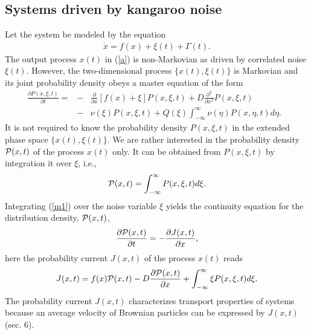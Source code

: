 \documentclass[authoryear,draft,1p,times]{elsarticle}
\renewcommand{\=}{\stackrel{\mathrm{d}}{=}}
\begin{document}

\subsection{Systems driven by kangaroo noise }

Let the system be  modeled by the equation  
%
\begin{eqnarray} \label{a}
\dot x = f(x)  + \xi(t) + \Gamma (t).
\end{eqnarray}
The output process $x(t)$ in (\ref{a})
is non-Markovian as driven by correlated noise $\xi(t)$.
However, the two-dimensional process $\{x(t), \xi(t)\}$ is
Markovian and its joint probability density
obeys a master equation of the form 
%
\begin{eqnarray}  \label{m1}
{\frac{\partial P(x, \xi, t)}{\partial t}}=
&-&{\frac \partial {\partial x}}
[f(x)+\xi] P(x, \xi, t)+D{\frac{\partial ^2}{\partial x^2}}
P(x,\xi, t)\nonumber\\
&-&\nu (\xi) P(x, \xi, t) + Q(\xi) \int_{-\infty}^{\infty} \nu (\eta)
P(x, \eta, t) d\eta.\ \ \
\end{eqnarray}
%
It is not required to know the probability density $P(x,\xi, t)$
in the extended phase space $\{x(t), \xi(t)\}$.  We are rather interested
in the probability density ${\cal P}(x, t)$ of the process $x(t)$ only.
It can be obtained from $P(x, \xi, t)$ by integration it over $\xi$, i.e.,
%
\begin{eqnarray}  \label{Px}
{\cal P}(x, t) =  \int_{-\infty}^{\infty} P(x, \xi, t) d\xi.
\end{eqnarray}
%
Integrating (\ref{m1}) over the noise variable $\xi$ yields the
continuity equation for the distribution density,
${\cal P}(x,t)$,
%
\begin{eqnarray}  \label{part1}
{\frac{\partial {\cal P}(x,t)}{\partial t}}
= -{\frac{\partial J(x,t)}{\partial x}},
\end{eqnarray}
%
here the probability current $J(x, t)$ of the process $x(t)$ reads
%
\begin{eqnarray}  \label{jot}
J(x, t)= f(x){\cal P}(x, t) -
D \frac{\partial {\cal P}(x,t)}{\partial x} +
\int_{-\infty}^{\infty} \xi P(x, \xi, t) d\xi.
\end{eqnarray}
%
The probability current $J(x, t)$ characterizes transport
properties of systems because an average velocity
of Brownian particles can be expressed by $J(x, t)$ (sec. 6).
\end{document}
